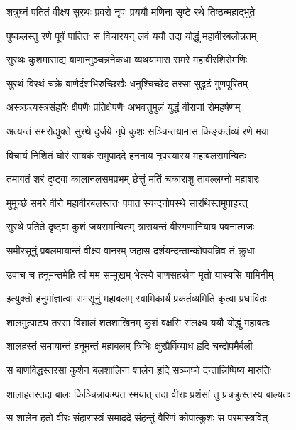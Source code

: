 

\twolineshloka
{शत्रुघ्नं पतितं वीक्ष्य सुरथः प्रवरो नृपः}
{प्रययौ मणिना सृष्टे रथे तिष्ठन्महाद्भुते}%

\twolineshloka
{पुष्कलस्तु रणे पूर्वं पातितः स विचारयन्}
{लवं ययौ तदा योद्धुं महावीरबलोन्नतम्}%

\twolineshloka
{सुरथः कुशमासाद्य बाणान्मुञ्चन्ननेकधा}
{व्यथयामास समरे महावीरशिरोमणिः}%

\twolineshloka
{सुरथं विरथं चक्रे बाणैर्दशभिरुच्छिखैः}
{धनुश्चिच्छेद तरसा सुदृढं गुणपूरितम्}%

\twolineshloka
{अस्त्रप्रत्यस्त्रसंहारैः क्षैपणैः प्रतिक्षेपणैः}
{अभवत्तुमुलं युद्धं वीराणां रोमहर्षणम्}%

\twolineshloka
{अत्यन्तं समरोद्युक्ते सुरथे दुर्जये नृपे}
{कुशः सञ्चिन्तयामास किङ्कर्तव्यं रणे मया}%

\twolineshloka
{विचार्य निशितं घोरं सायकं समुपाददे}
{हननाय नृपस्यास्य महाबलसमन्वितः}%

\twolineshloka
{तमागतं शरं दृष्ट्वा कालानलसमप्रभम्}
{छेत्तुं मतिं चकाराशु तावल्लग्नो महाशरः}%

\twolineshloka
{मुमूर्च्छ समरे वीरो महावीरबलस्ततः}
{पपात स्यन्दनोपस्थे सारथिस्तमुपाहरत्}%

\twolineshloka
{सुरथे पतिते दृष्ट्वा कुशं जयसमन्वितम्}
{त्रासयन्तं वीरगणानियाय पवनात्मजः}%

\twolineshloka
{समीरसूनुं प्रबलमायान्तं वीक्ष्य वानरम्}
{जहास दर्शयन्दन्तान्कोपयन्निव तं क्रुधा}%

\twolineshloka
{उवाच च हनूमन्तमेहि त्वं मम सम्मुखम्}
{भेत्स्ये बाणसहस्रेण मृतो यास्यसि यामिनीम्}%

\twolineshloka
{इत्युक्तो हनुमांज्ञात्वा रामसूनुं महाबलम्}
{स्वामिकार्यं प्रकर्तव्यमिति कृत्वा प्रधावितः}%

\twolineshloka
{शालमुत्पाट्य तरसा विशालं शतशाखिनम्}
{कुशं वक्षसि संलक्ष्य ययौ योद्धुं महाबलः}%

\twolineshloka
{शालहस्तं समायान्तं हनूमन्तं महाबलम्}
{त्रिभिः क्षुरप्रैर्विव्याध हृदि चन्द्रोपमैर्बली}%

\twolineshloka
{स बाणविद्धस्तरसा कुशेन बलशालिना}
{शालेन हृदि सञ्जघ्ने दन्तान्निष्पिष्य मारुतिः}%

\twolineshloka
{शालाहतस्तदा बालः किञ्चिन्नाकम्पत स्मयात्}
{तदा वीराः प्रशंसां तु प्रचक्रुस्तस्य बाल्यतः}%

\twolineshloka
{स शालेन हतो वीरः संहारास्त्रं समाददे}
{संहन्तुं वैरिणं कोपात्कुशः स परमास्त्रवित्}%

